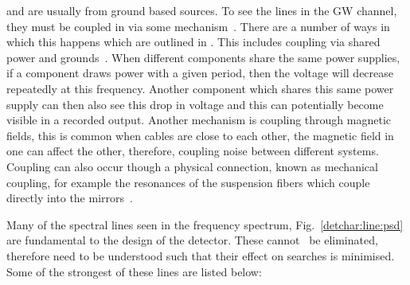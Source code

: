 and are usually from ground based sources.  To see the lines in the \gls{GW}
channel, they must be coupled in via some mechanism~.  There are a number of
ways in which this happens which are outlined in
\citep{covas2018IdentificationMitigation}.  This includes coupling via shared
power and grounds~.  When different components share the same power supplies, if
a component draws power with a given period, then the voltage will decrease
repeatedly at this frequency.  Another component which shares this same power
supply can then also see this drop in voltage and this can potentially become
visible in a recorded output.  Another mechanism is coupling through magnetic
fields, this is common when cables are close to each other, the magnetic field
in one can affect the other, therefore, coupling noise between different
systems.  Coupling can also occur though a physical connection, known as
mechanical coupling, for example the resonances of the suspension fibers which
couple directly into the mirrors~.

%

Many of the spectral lines seen in the frequency spectrum,
Fig.~\ref{detchar:line:psd} are fundamental to the design of the detector.
These cannot~ be eliminated, therefore need to be understood such that their
effect on searches is minimised.  Some of the strongest of these lines are
listed below:

